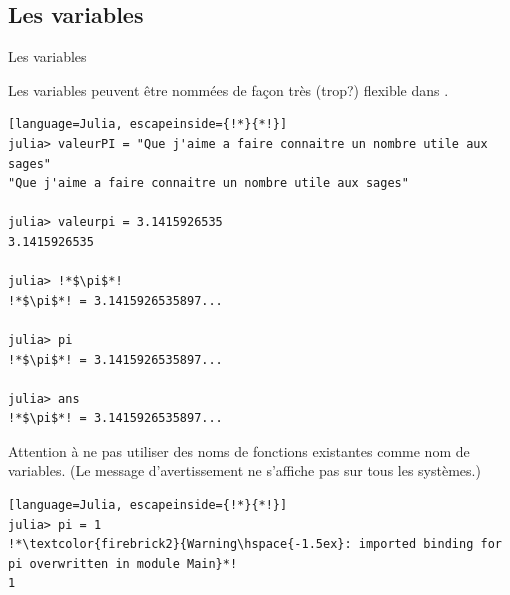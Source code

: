 \subsection{Les variables}
\begin{frame}[containsverbatim]{Les variables}
\par{Les variables peuvent être nommées de façon très (trop?) flexible dans {\Julia}.}
\begin{lstlisting}[language=Julia, escapeinside={!*}{*!}]
julia> valeurPI = "Que j'aime a faire connaitre un nombre utile aux sages"
"Que j'aime a faire connaitre un nombre utile aux sages"

julia> valeurpi = 3.1415926535
3.1415926535

julia> !*$\pi$*!
!*$\pi$*! = 3.1415926535897...

julia> pi
!*$\pi$*! = 3.1415926535897...

julia> ans
!*$\pi$*! = 3.1415926535897...
\end{lstlisting}
\vspace{2ex}
\par{\textcolor{firebrick2}{Attention à ne pas utiliser des noms de fonctions existantes comme nom de variables.} (Le message d'avertissement ne s'affiche pas sur tous les systèmes.)}
\begin{lstlisting}[language=Julia, escapeinside={!*}{*!}]
julia> pi = 1
!*\textcolor{firebrick2}{Warning\hspace{-1.5ex}: imported binding for pi overwritten in module Main}*!
1
\end{lstlisting}
\end{frame}


